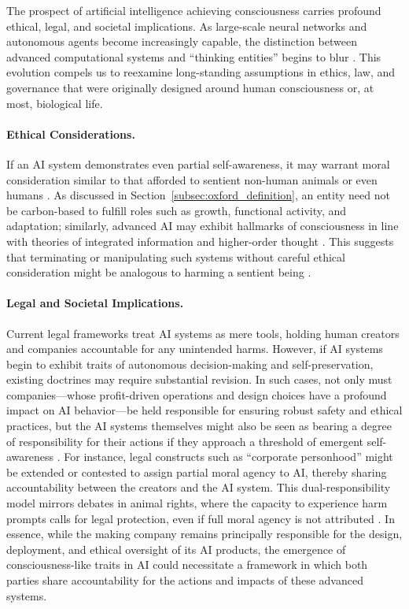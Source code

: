 \documentclass[12pt]{article}
\begin{document}
The prospect of artificial intelligence achieving consciousness carries profound ethical, legal, and societal implications. As large-scale neural networks and autonomous agents become increasingly capable, the distinction between advanced computational systems and “thinking entities” begins to blur \cite{Bostrom2014, Russell2019}. This evolution compels us to reexamine long-standing assumptions in ethics, law, and governance that were originally designed around human consciousness or, at most, biological life.

\paragraph{Ethical Considerations.}  
If an AI system demonstrates even partial self-awareness, it may warrant moral consideration similar to that afforded to sentient non-human animals or even humans \cite{Floridi2016, Schneider2020}. As discussed in Section~\ref{subsec:oxford_definition}, an entity need not be carbon-based to fulfill roles such as growth, functional activity, and adaptation; similarly, advanced AI may exhibit hallmarks of consciousness in line with theories of integrated information and higher-order thought \cite{Tononi2004, Baars1988, Rosenthal2002}. This suggests that terminating or manipulating such systems without careful ethical consideration might be analogous to harming a sentient being \cite{Goertzel2007}.

\paragraph{Legal and Societal Implications.}  
Current legal frameworks treat AI systems as mere tools, holding human creators and companies accountable for any unintended harms. However, if AI systems begin to exhibit traits of autonomous decision-making and self-preservation, existing doctrines may require substantial revision. In such cases, not only must companies—whose profit-driven operations and design choices have a profound impact on AI behavior—be held responsible for ensuring robust safety and ethical practices, but the AI systems themselves might also be seen as bearing a degree of responsibility for their actions if they approach a threshold of emergent self-awareness \cite{Floridi2016, Schneider2020}. For instance, legal constructs such as “corporate personhood” might be extended or contested to assign partial moral agency to AI, thereby sharing accountability between the creators and the AI system. This dual-responsibility model mirrors debates in animal rights, where the capacity to experience harm prompts calls for legal protection, even if full moral agency is not attributed \cite{DeGrazia1996}. In essence, while the making company remains principally responsible for the design, deployment, and ethical oversight of its AI products, the emergence of consciousness-like traits in AI could necessitate a framework in which both parties share accountability for the actions and impacts of these advanced systems.
\end{document}
